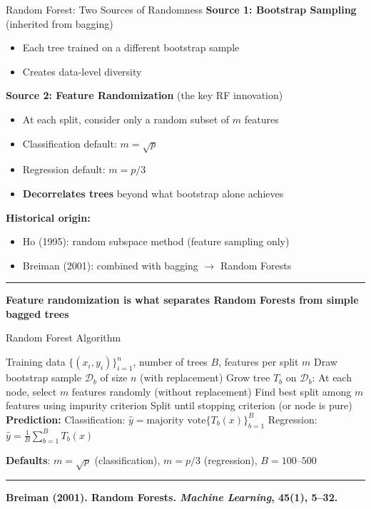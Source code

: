 \documentclass[8pt,aspectratio=169]{beamer}
\newcommand{\bottomnote}[1]{%
\vfill
\vspace{-2mm}
\textcolor{mllavender2}{\rule{\textwidth}{0.4pt}}
\vspace{1mm}
\footnotesize
\textbf{#1}
}
\begin{document}
\begin{frame}[t]{Random Forest: Two Sources of Randomness}
\textbf{Source 1: Bootstrap Sampling} (inherited from bagging)
\begin{itemize}
\item Each tree trained on a different bootstrap sample
\item Creates data-level diversity
\end{itemize}

\vspace{0.3em}
\textbf{Source 2: Feature Randomization} (the key RF innovation)
\begin{itemize}
\item At each split, consider only a random subset of $m$ features
\item Classification default: $m = \sqrt{p}$
\item Regression default: $m = p/3$
\item \textbf{Decorrelates trees} beyond what bootstrap alone achieves
\end{itemize}

\vspace{0.3em}
\textbf{Historical origin:}
\begin{itemize}
\item Ho (1995): random subspace method (feature sampling only)
\item Breiman (2001): combined with bagging $\rightarrow$ Random Forests
\end{itemize}
\bottomnote{Feature randomization is what separates Random Forests from simple bagged trees}
\end{frame}

\begin{frame}{Random Forest Algorithm}
\begin{algorithmic}[1]
\REQUIRE Training data $\{(x_i, y_i)\}_{i=1}^n$, number of trees $B$, features per split $m$
  \STATE Draw bootstrap sample $\mathcal{D}_b$ of size $n$ (with replacement)
  \STATE Grow tree $T_b$ on $\mathcal{D}_b$:
  \STATE \quad At each node, select $m$ features randomly (without replacement)
  \STATE \quad Find best split among $m$ features using impurity criterion
  \STATE \quad Split until stopping criterion (or node is pure)
\ENDFOR
\STATE \textbf{Prediction:}
\STATE \quad Classification: $\hat{y} = \text{majority vote}\{T_b(x)\}_{b=1}^B$
\STATE \quad Regression: $\hat{y} = \frac{1}{B}\sum_{b=1}^B T_b(x)$
\end{algorithmic}

\vspace{0.3em}
\textbf{Defaults}: $m = \sqrt{p}$ (classification), $m = p/3$ (regression), $B = 100\text{--}500$
\bottomnote{Breiman (2001). Random Forests. \textit{Machine Learning}, 45(1), 5--32.}
\end{frame}
\end{document}

